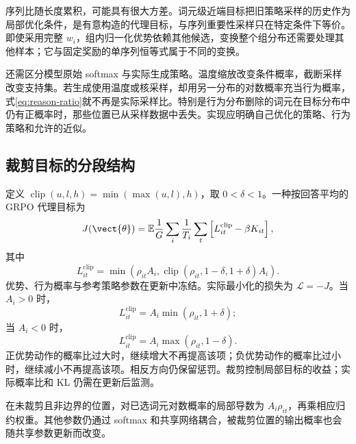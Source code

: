 \documentclass[../textbook.tex]{subfiles}
\begin{document}
序列比随长度累积，可能具有很大方差。词元级近端目标把旧策略采样的历史作为局部优化条件，是有意构造的代理目标，与序列重要性采样只在特定条件下等价。即使采用完整 $w_i$，组内归一化优势依赖其他候选，变换整个组分布还需要处理其他样本；它与固定奖励的单序列恒等式属于不同的变换。

还需区分模型原始 softmax 与实际生成策略。温度缩放改变条件概率，截断采样改变支持集。若生成使用温度或核采样，却用另一分布的对数概率充当行为概率，式\eqref{eq:reason-ratio}就不再是实际采样比。特别是行为分布删除的词元在目标分布中仍有正概率时，那些位置已从采样数据中丢失。实现应明确自己优化的策略、行为策略和允许的近似。

\subsection{裁剪目标的分段结构}
定义 $\operatorname{clip}(u,l,h)=\min(\max(u,l),h)$，取 $0<\delta<1$。一种按回答平均的 GRPO 代理目标为
\begin{equation}
 J(\vect{\theta})=\mathbb E\frac1G\sum_i\frac1{T_i}\sum_t
 \left[L_{it}^{\mathrm{clip}}-\beta K_{it}\right],
\end{equation}
其中
\begin{equation}
 L_{it}^{\mathrm{clip}}=
 \min\left(\rho_{it}A_i,
 \operatorname{clip}(\rho_{it},1-\delta,1+\delta)A_i\right).
\end{equation}
优势、行为概率与参考策略参数在更新中冻结。实际最小化的损失为 $\mathcal L=-J$。当 $A_i>0$ 时，
\begin{equation}
 L_{it}^{\mathrm{clip}}=A_i\min(\rho_{it},1+\delta);
\end{equation}
当 $A_i<0$ 时，
\begin{equation}
 L_{it}^{\mathrm{clip}}=A_i\max(\rho_{it},1-\delta).
\end{equation}
正优势动作的概率比过大时，继续增大不再提高该项；负优势动作的概率比过小时，继续减小不再提高该项。相反方向仍保留惩罚。裁剪控制局部目标的收益；实际概率比和 KL 仍需在更新后监测。

在未裁剪且非边界的位置，对已选词元对数概率的局部导数为 $A_i\rho_{it}$，再乘相应归约权重。其他参数仍通过 softmax 和共享网络耦合，被裁剪位置的输出概率也会随共享参数更新而改变。
\end{document}

